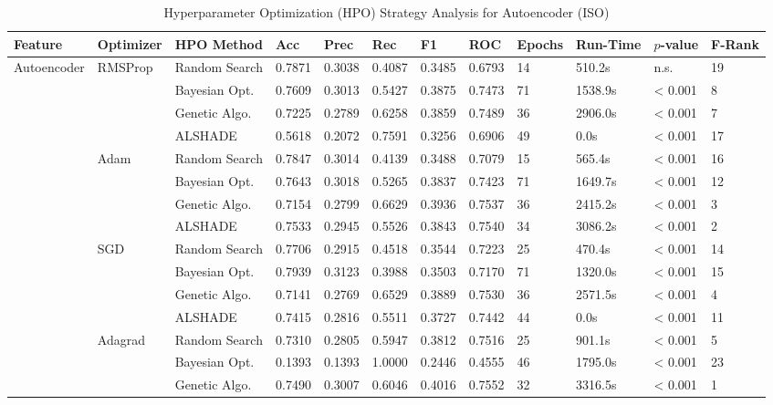 \documentclass[conference]{IEEEtran}
\begin{document}
\begin{table}[t]
\centering
\scriptsize
\caption{Hyperparameter Optimization (HPO) Strategy Analysis for Autoencoder (ISO)}
\label{tab:opt_ae_iso}
\begin{tabular}{llllllllllll}
\toprule 
\textbf{Feature} & \textbf{Optimizer} & \textbf{HPO Method} & \textbf{Acc} & \textbf{Prec} & \textbf{Rec} & \textbf{F1} & \textbf{ROC} & \textbf{Epochs} & \textbf{Run-Time} & \textbf{$p$-value} & \textbf{F-Rank}  \\
\midrule
\multirow{24}{*}{ Autoencoder} & \multirow{4}{*}{ RMSProp} & Random Search & 0.7871 & 0.3038 & 0.4087 & 0.3485 & 0.6793 & 14 & 510.2s & n.s. & 19 \\
 &  & Bayesian Opt. & 0.7609 & 0.3013 & 0.5427 & 0.3875 & 0.7473 & 71 & 1538.9s & < 0.001 & 8 \\
 &  & Genetic Algo. & 0.7225 & 0.2789 & 0.6258 & 0.3859 & 0.7489 & 36 & 2906.0s & < 0.001 & 7 \\
 &  & ALSHADE & 0.5618 & 0.2072 & 0.7591 & 0.3256 & 0.6906 & 49 & 0.0s & < 0.001 & 17 \\
\cline{2-12}
 & \multirow{4}{*}{ Adam} & Random Search & 0.7847 & 0.3014 & 0.4139 & 0.3488 & 0.7079 & 15 & 565.4s & < 0.001 & 16 \\
 &  & Bayesian Opt. & 0.7643 & 0.3018 & 0.5265 & 0.3837 & 0.7423 & 71 & 1649.7s & < 0.001 & 12 \\
 &  & Genetic Algo. & 0.7154 & 0.2799 & 0.6629 & 0.3936 & 0.7537 & 36 & 2415.2s & < 0.001 & 3 \\
 &  & ALSHADE & 0.7533 & 0.2945 & 0.5526 & 0.3843 & 0.7540 & 34 & 3086.2s & < 0.001 & 2 \\
\cline{2-12}
 & \multirow{4}{*}{ SGD} & Random Search & 0.7706 & 0.2915 & 0.4518 & 0.3544 & 0.7223 & 25 & 470.4s & < 0.001 & 14 \\
 &  & Bayesian Opt. & 0.7939 & 0.3123 & 0.3988 & 0.3503 & 0.7170 & 71 & 1320.0s & < 0.001 & 15 \\
 &  & Genetic Algo. & 0.7141 & 0.2769 & 0.6529 & 0.3889 & 0.7530 & 36 & 2571.5s & < 0.001 & 4 \\
 &  & ALSHADE & 0.7415 & 0.2816 & 0.5511 & 0.3727 & 0.7442 & 44 & 0.0s & < 0.001 & 11 \\
\cline{2-12}
 & \multirow{4}{*}{ Adagrad} & Random Search & 0.7310 & 0.2805 & 0.5947 & 0.3812 & 0.7516 & 25 & 901.1s & < 0.001 & 5 \\
 &  & Bayesian Opt. & 0.1393 & 0.1393 & 1.0000 & 0.2446 & 0.4555 & 46 & 1795.0s & < 0.001 & 23 \\
 &  & Genetic Algo. & 0.7490 & 0.3007 & 0.6046 & 0.4016 & 0.7552 & 32 & 3316.5s & < 0.001 & 1 \\

\end{tabular}
\end{table}
\end{document}
